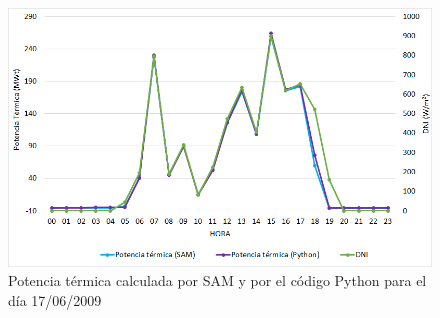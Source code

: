 \begin{figure}[!h]
\includegraphics[width=0.9\linewidth]{images/176potencia.png}
\caption{Potencia térmica calculada por SAM y por el código Python para el día 17/06/2009} 
\label{fig:176potencia}
\end{figure}


